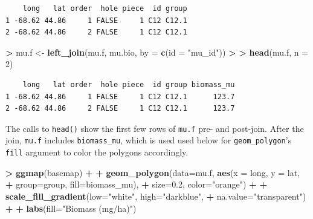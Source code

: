 \documentclass[]{krantz}
\makeatletter
\newenvironment{Shaded}{\begin{snugshade}}{\end{snugshade}}
\newcommand{\KeywordTok}[1]{\textcolor[rgb]{0.27,0.27,0.27}{\textbf{#1}}}
\newcommand{\DataTypeTok}[1]{\textcolor[rgb]{0.27,0.27,0.27}{#1}}
\newcommand{\DecValTok}[1]{\textcolor[rgb]{0.06,0.06,0.06}{#1}}
\newcommand{\FloatTok}[1]{\textcolor[rgb]{0.06,0.06,0.06}{#1}}
\newcommand{\StringTok}[1]{\textcolor[rgb]{0.5,0.5,0.5}{#1}}
\newcommand{\OperatorTok}[1]{\textcolor[rgb]{0.43,0.43,0.43}{\textbf{#1}}}
\newcommand{\ErrorTok}[1]{\textcolor[rgb]{0.14,0.14,0.14}{\textbf{#1}}}
\newcommand{\NormalTok}[1]{#1}
\newenvironment{kframe}{%
\medskip{}
\setlength{\fboxsep}{.8em}
 \def\at@end@of@kframe{}%
 \ifinner\ifhmode%
  \def\at@end@of@kframe{\end{minipage}}%
  \begin{minipage}{\columnwidth}%
 \fi\fi%
 \def\FrameCommand##1{\hskip\@totalleftmargin \hskip-\fboxsep
 \colorbox{shadecolor}{##1}\hskip-\fboxsep
     \hskip-\linewidth \hskip-\@totalleftmargin \hskip\columnwidth}%
 \MakeFramed {\advance\hsize-\width
   \@totalleftmargin\z@ \linewidth\hsize
   \@setminipage}}%
 {\par\unskip\endMakeFramed%
 \at@end@of@kframe}
\renewenvironment{Shaded}{\begin{kframe}}{\end{kframe}}
\theoremstyle{definition}
\theoremstyle{definition}
\theoremstyle{definition}
\theoremstyle{remark}
\makeatother
\begin{document}
\begin{verbatim}
    long   lat order  hole piece  id group
1 -68.62 44.86     1 FALSE     1 C12 C12.1
2 -68.62 44.86     2 FALSE     1 C12 C12.1
\end{verbatim}

\begin{Shaded}
\begin{Highlighting}[]
\OperatorTok{>}\StringTok{ }\NormalTok{mu.f <-}\StringTok{ }\KeywordTok{left_join}\NormalTok{(mu.f, mu.bio, }\DataTypeTok{by =} \KeywordTok{c}\NormalTok{(}\DataTypeTok{id =} \StringTok{"mu_id"}\NormalTok{))}
\OperatorTok{>}\StringTok{ }
\ErrorTok{>}\StringTok{ }\KeywordTok{head}\NormalTok{(mu.f, }\DataTypeTok{n =} \DecValTok{2}\NormalTok{)}
\end{Highlighting}
\end{Shaded}

\begin{verbatim}
    long   lat order  hole piece  id group biomass_mu
1 -68.62 44.86     1 FALSE     1 C12 C12.1      123.7
2 -68.62 44.86     2 FALSE     1 C12 C12.1      123.7
\end{verbatim}

The calls to \texttt{head()} show the first few rows of \texttt{mu.f}
pre- and post-join. After the join, \texttt{mu.f} includes
\texttt{biomass\_mu}, which is used used below for
\texttt{geom\_polygon}'s \texttt{fill} argument to color the polygons
accordingly.

\begin{Shaded}
\begin{Highlighting}[]
\OperatorTok{>}\StringTok{ }\KeywordTok{ggmap}\NormalTok{(basemap) }\OperatorTok{+}
\OperatorTok{+}\StringTok{     }\KeywordTok{geom_polygon}\NormalTok{(}\DataTypeTok{data=}\NormalTok{mu.f, }\KeywordTok{aes}\NormalTok{(}\DataTypeTok{x =}\NormalTok{ long, }\DataTypeTok{y =}\NormalTok{ lat, }
\OperatorTok{+}\StringTok{                                 }\DataTypeTok{group=}\NormalTok{group, }\DataTypeTok{fill=}\NormalTok{biomass_mu), }
\OperatorTok{+}\StringTok{                  }\DataTypeTok{size=}\FloatTok{0.2}\NormalTok{, }\DataTypeTok{color=}\StringTok{"orange"}\NormalTok{) }\OperatorTok{+}
\OperatorTok{+}\StringTok{     }\KeywordTok{scale_fill_gradient}\NormalTok{(}\DataTypeTok{low=}\StringTok{"white"}\NormalTok{, }\DataTypeTok{high=}\StringTok{"darkblue"}\NormalTok{, }
\OperatorTok{+}\StringTok{                         }\DataTypeTok{na.value=}\StringTok{"transparent"}\NormalTok{) }\OperatorTok{+}
\OperatorTok{+}\StringTok{     }\KeywordTok{labs}\NormalTok{(}\DataTypeTok{fill=}\StringTok{"Biomass (mg/ha)"}\NormalTok{)}
\end{Highlighting}
\end{Shaded}
\end{document}
